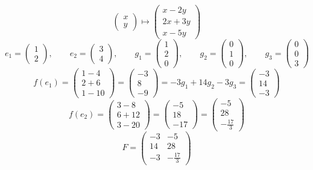 $$
\begin{pmatrix}
	x \\
    y
\end{pmatrix} \mapsto
\begin{pmatrix}
	x - 2y \\
    2x + 3y \\
    x - 5y
\end{pmatrix} $$
$$ e_1 =
\begin{pmatrix}
	1 \\
    2
\end{pmatrix}, \qquad e_2 =
\begin{pmatrix}
	3 \\
    4
\end{pmatrix}, \qquad g_1 =
\begin{pmatrix}
	1 \\
    2 \\
    0
\end{pmatrix}, \qquad g_2 =
\begin{pmatrix}
	0 \\
    1 \\
    0
\end{pmatrix}, \qquad g_3 =
\begin{pmatrix}
	0 \\
    0 \\
    3
\end{pmatrix} $$
$$ f(e_1) =
\begin{pmatrix}
	1 - 4 \\
    2 + 6 \\
    1 - 10
\end{pmatrix} =
\begin{pmatrix}
	-3 \\
    8 \\
    -9
\end{pmatrix} = -3g_1 + 14g_2 - 3g_3 =
\begin{pmatrix}
	-3 \\
    14 \\
    -3
\end{pmatrix} $$
$$ f(e_2) =
\begin{pmatrix}
	3 - 8 \\
    6 + 12 \\
    3 - 20
\end{pmatrix} =
\begin{pmatrix}
	-5 \\
    18 \\
    -17
\end{pmatrix} =
\begin{pmatrix}
	-5 \\
    28 \\
    -\frac{17}3
\end{pmatrix} $$
$$ F =
\begin{pmatrix}
	-3 & -5 \\
    14 & 28 \\
    -3 & -\frac{17}3
\end{pmatrix} $$

